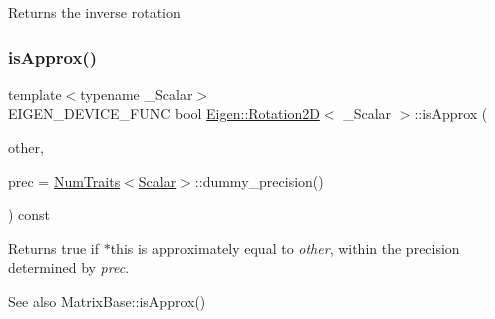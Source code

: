 \begin{DoxyReturn}{Returns}
the inverse rotation 
\end{DoxyReturn}
\mbox{\label{class_eigen_1_1_rotation2_d_ac70ab985fd67d3cc43ea75c33c01ae3a}} 
\subsubsection{\texorpdfstring{isApprox()}{isApprox()}}
{\footnotesize\ttfamily template$<$typename \+\_\+\+Scalar$>$ \\
E\+I\+G\+E\+N\+\_\+\+D\+E\+V\+I\+C\+E\+\_\+\+F\+U\+NC bool \mbox{\hyperlink{class_eigen_1_1_rotation2_d}{Eigen\+::\+Rotation2D}}$<$ \+\_\+\+Scalar $>$\+::is\+Approx (\begin{DoxyParamCaption}\item[{const \mbox{\hyperlink{class_eigen_1_1_rotation2_d}{Rotation2D}}$<$ \+\_\+\+Scalar $>$ \&}]{other,  }\item[{const typename \mbox{\hyperlink{struct_eigen_1_1_num_traits}{Num\+Traits}}$<$ \mbox{\hyperlink{class_eigen_1_1_rotation2_d_ac20c665ece0f197a712a2a39ae72e4e4}{Scalar}} $>$\+::Real \&}]{prec = {\ttfamily \mbox{\hyperlink{struct_eigen_1_1_num_traits}{Num\+Traits}}$<$\mbox{\hyperlink{class_eigen_1_1_rotation2_d_ac20c665ece0f197a712a2a39ae72e4e4}{Scalar}}$>$\+:\+:dummy\+\_\+precision()} }\end{DoxyParamCaption}) const\hspace{0.3cm}{\ttfamily [inline]}}

\begin{DoxyReturn}{Returns}
{\ttfamily true} if {\ttfamily $\ast$this} is approximately equal to {\itshape other}, within the precision determined by {\itshape prec}.
\end{DoxyReturn}
\begin{DoxySeeAlso}{See also}
Matrix\+Base\+::is\+Approx() 
\end{DoxySeeAlso}
\mbox{\label{class_eigen_1_1_rotation2_d_a8e898700917c12448a78b5128664be23}} 
